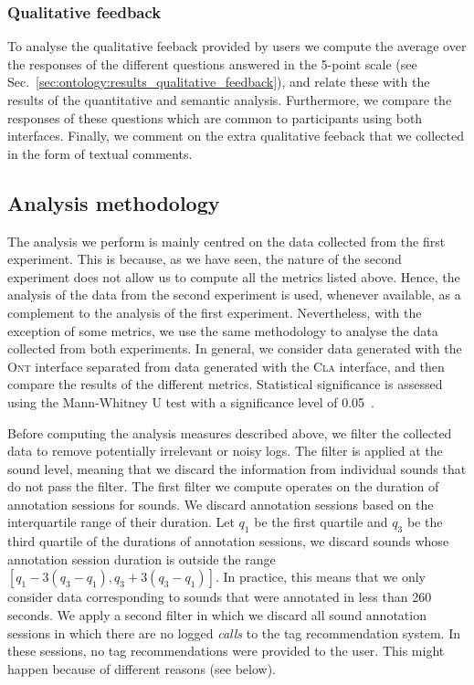 \subsubsection{Qualitative feedback}
To analyse the qualitative feeback provided by users we compute the average over the responses of the different questions answered in the 5-point scale (see Sec.~\ref{sec:ontology:results_qualitative_feedback}), and relate these with the results of the quantitative and semantic analysis. 
Furthermore, we compare the responses of these questions which are common to participants using both interfaces.
Finally, we comment on the extra qualitative feeback that we collected in the form of textual comments.


\subsection{Analysis methodology}
\label{sec:ontology:analysis_methodology}

The analysis we perform is mainly centred on the data collected from the first experiment. This is because, as we have seen, the nature of the second experiment does not allow us to compute all the metrics listed above. Hence, the analysis of the data from the second experiment is used, whenever available, as a complement to the analysis of the first experiment. Nevertheless, with the exception of some metrics, we use the same methodology to analyse the data collected from both experiments. In general, we consider data generated with the \textsc{Ont} interface separated from data generated with the \textsc{Cla} interface, and then compare the results of the different metrics. Statistical significance is assessed using the Mann-Whitney U test with a significance level of 0.05~\citep{Corder2009}.

Before computing the analysis measures described above, we filter the collected data to remove potentially irrelevant or noisy logs.
The filter is applied at the sound level, meaning that we discard the information from individual sounds that do not pass the filter.
The first filter we compute operates on the duration of annotation sessions for sounds.
We discard annotation sessions based on the interquartile range of their duration.
Let $q_1$ be the first quartile and $q_3$ be the third quartile of the durations of annotation sessions, we discard sounds whose annotation session duration is outside the range $[q_1 - 3(q_3 - q_1), q_3 + 3(q_3 - q_1)]$. In practice, this means that we only consider data corresponding to sounds that were annotated in less than 260 seconds.
We apply a second filter in which we discard all sound annotation sessions in which there are no logged \emph{calls} to the tag recommendation system. In these sessions, no tag recommendations were provided to the user. This might happen because of different reasons (see below).


